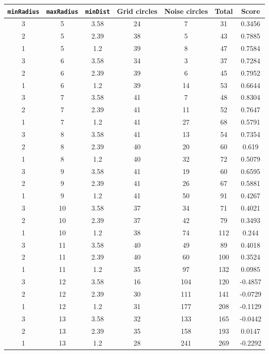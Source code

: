 \documentclass[letterpaper, 12pt]{article}
\begin{document}
\begin{longtable}{|c|c|c|c|c|c|c|}
\hline
\textbf{\texttt{minRadius}} & \textbf{\texttt{maxRadius}} & \textbf{\texttt{minDist}} & \textbf{Grid circles} & \textbf{Noise circles} & \textbf{Total} & \textbf{Score} \\
\hline
3 & 5 & 3.58 & 24 & 7 & 31 & 0.3456 \\
\hline
2 & 5 & 2.39 & 38 & 5 & 43 & 0.7885 \\
\hline
1 & 5 & 1.2 & 39 & 8 & 47 & 0.7584 \\
\hline
3 & 6 & 3.58 & 34 & 3 & 37 & 0.7284 \\
\hline
2 & 6 & 2.39 & 39 & 6 & 45 & 0.7952 \\
\hline
1 & 6 & 1.2 & 39 & 14 & 53 & 0.6644 \\
\hline
3 & 7 & 3.58 & 41 & 7 & 48 & 0.8304 \\
\hline
2 & 7 & 2.39 & 41 & 11 & 52 & 0.7647 \\
\hline
1 & 7 & 1.2 & 41 & 27 & 68 & 0.5791 \\
\hline
3 & 8 & 3.58 & 41 & 13 & 54 & 0.7354 \\
\hline
2 & 8 & 2.39 & 40 & 20 & 60 & 0.619 \\
\hline
1 & 8 & 1.2 & 40 & 32 & 72 & 0.5079 \\
\hline
3 & 9 & 3.58 & 41 & 19 & 60 & 0.6595 \\
\hline
2 & 9 & 2.39 & 41 & 26 & 67 & 0.5881 \\
\hline
1 & 9 & 1.2 & 41 & 50 & 91 & 0.4267 \\
\hline
3 & 10 & 3.58 & 37 & 34 & 71 & 0.4021 \\
\hline
2 & 10 & 2.39 & 37 & 42 & 79 & 0.3493 \\
\hline
1 & 10 & 1.2 & 38 & 74 & 112 & 0.244 \\
\hline
3 & 11 & 3.58 & 40 & 49 & 89 & 0.4018 \\
\hline
2 & 11 & 2.39 & 40 & 60 & 100 & 0.3524 \\
\hline
1 & 11 & 1.2 & 35 & 97 & 132 & 0.0985 \\
\hline
3 & 12 & 3.58 & 16 & 104 & 120 & -0.4857 \\
\hline
2 & 12 & 2.39 & 30 & 111 & 141 & -0.0729 \\
\hline
1 & 12 & 1.2 & 31 & 177 & 208 & -0.1129 \\
\hline
3 & 13 & 3.58 & 32 & 133 & 165 & -0.0442 \\
\hline
2 & 13 & 2.39 & 35 & 158 & 193 & 0.0147 \\
\hline
1 & 13 & 1.2 & 28 & 241 & 269 & -0.2292 \\

\end{longtable}
\end{document}
